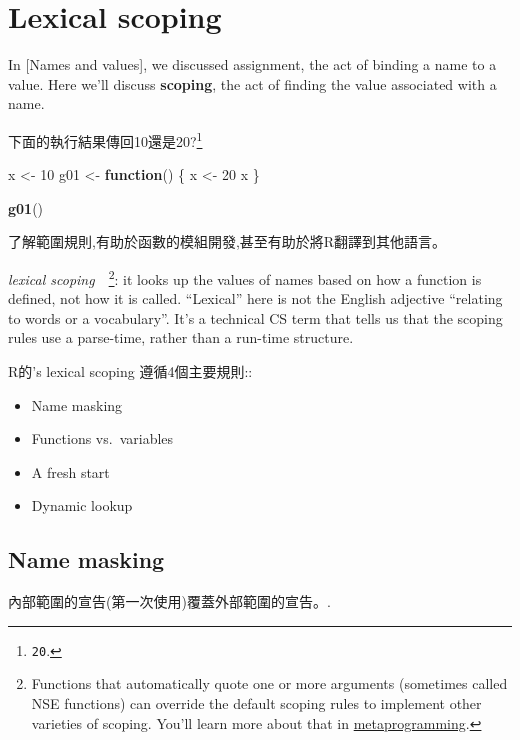 \documentclass[]{book}
\newenvironment{Shaded}{\begin{snugshade}}{\end{snugshade}}
\newcommand{\KeywordTok}[1]{\textcolor[rgb]{0.13,0.29,0.53}{\textbf{#1}}}
\newcommand{\DecValTok}[1]{\textcolor[rgb]{0.00,0.00,0.81}{#1}}
\newcommand{\StringTok}[1]{\textcolor[rgb]{0.31,0.60,0.02}{#1}}
\newcommand{\ControlFlowTok}[1]{\textcolor[rgb]{0.13,0.29,0.53}{\textbf{#1}}}
\newcommand{\NormalTok}[1]{#1}
\providecommand{\tightlist}{%
  \setlength{\itemsep}{0pt}\setlength{\parskip}{0pt}}
\let\rmarkdownfootnote\footnote%
\def\footnote{\protect\rmarkdownfootnote}
\theoremstyle{definition}
\theoremstyle{definition}
\theoremstyle{definition}
\theoremstyle{remark}
\begin{document}
\section{Lexical scoping}\label{lexical-scoping}

In {[}Names and values{]}, we discussed assignment, the act of binding a
name to a value. Here we'll discuss \textbf{scoping}, the act of finding
the value associated with a name.

下面的執行結果傳回10還是20?\footnote{\texttt{20}.}

\begin{Shaded}
\begin{Highlighting}[]
\NormalTok{x <-}\StringTok{ }\DecValTok{10}
\NormalTok{g01 <-}\StringTok{ }\ControlFlowTok{function}\NormalTok{() \{}
\NormalTok{  x <-}\StringTok{ }\DecValTok{20}
\NormalTok{  x}
\NormalTok{\}}

\KeywordTok{g01}\NormalTok{()}
\end{Highlighting}
\end{Shaded}

了解範圍規則,有助於函數的模組開發,甚至有助於將R翻譯到其他語言。

\emph{lexical scoping}　\footnote{Functions that automatically quote one
  or more arguments (sometimes called NSE functions) can override the
  default scoping rules to implement other varieties of scoping. You'll
  learn more about that in \protect\hyperlink{meta}{metaprogramming}.}:
it looks up the values of names based on how a function is defined, not
how it is called. ``Lexical'' here is not the English adjective
``relating to words or a vocabulary''. It's a technical CS term that
tells us that the scoping rules use a parse-time, rather than a run-time
structure.

R的's lexical scoping 遵循4個主要規則::

\begin{itemize}
\tightlist
\item
  Name masking
\item
  Functions vs.~variables
\item
  A fresh start
\item
  Dynamic lookup
\end{itemize}

\subsection{Name masking}\label{name-masking}

內部範圍的宣告(第一次使用)覆蓋外部範圍的宣告。.
\end{document}
